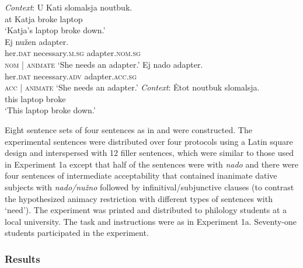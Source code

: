 \documentclass[output=paper]{langscibook}
\begin{document}
\ea \label{materials-exp1b-anim} \gll \textit{Context}: U Kati slomalsja noutbuk.
\\
{} at Katja broke laptop\\
\glt \hspace{1.3cm} `Katja's laptop broke down.'\\
\ea \gll Ej nužen adapter.\\
her.\textsc{dat} necessary.\textsc{m.sg} adapter.\textsc{nom.sg}\\ \hfill \textsc{nom} | \textsc{animate}
\glt `She needs an adapter.'
\ex \gll Ej nado adapter.\\
her.\textsc{dat} necessary.\textsc{adv} adapter.\textsc{acc.sg}\\ \hfill \textsc{acc} | \textsc{animate}
\glt `She needs an adapter.'
\z \ex \label{materials-exp1b-inan} \gll \textit{Context}: Ėtot noutbuk slomalsja.\\
{} this laptop broke\\
\glt \hspace{1.3cm} `This laptop broke down.' \\
\z\z

\noindent Eight sentence sets of four sentences as in  and  were constructed. The experimental sentences were distributed over four protocols using a Latin square design and interspersed with 12 filler sentences, which were similar to those used in Experiment 1a except that half of the sentences were with \textit{nado} and there were four sentences of intermediate acceptability that contained inanimate dative subjects with \textit{nado/nužno} followed by infinitival/subjunctive clauses (to contrast the hypothesized animacy restriction with different types of sentences with `need'). The experiment was printed and distributed to philology students at a local university. The task and instructions were as in Experiment 1a. Seventy-one students participated in the experiment.

\subsubsection{Results}
\end{document}
